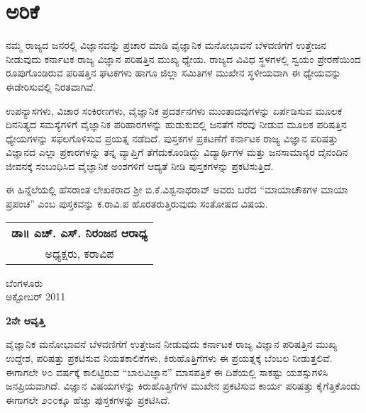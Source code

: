 \chapter*{ಅರಿಕೆ}

\phantom{a}

\vskip  -1.2cm

ನಮ್ಮ ರಾಜ್ಯದ ಜನರಲ್ಲಿ ವಿಜ್ಞಾನವನ್ನು ಪ್ರಚಾರ ಮಾಡಿ ವೈಜ್ಞಾನಿಕ ಮನೋಭಾವನೆ \linebreak ಬೆಳವಣಿಗೆಗೆ ಉತ್ತೇಜನ ನೀಡುವುದು ಕರ್ನಾಟಕ ರಾಜ್ಯ ವಿಜ್ಞಾನ ಪರಿಷತ್ತಿನ ಮುಖ್ಯ ಧ್ಯೇಯ. ರಾಜ್ಯದ ವಿವಿಧ ಸ್ಥಳಗಳಲ್ಲಿ ಸ್ವಯಂ ಪ್ರೇರಣೆಯಿಂದ ರೂಪುಗೊಂಡಿರುವ ಪರಿಷತ್ತಿನ ಘಟಕ\-ಗಳು ಹಾಗೂ ಜಿಲ್ಲಾ ಸಮಿತಿಗಳ ಮುಖೇನ ಸ್ಥಳೀಯವಾಗಿ ಈ ಧ್ಯೇಯವನ್ನು ಈಡೇರಿಸುವಲ್ಲಿ ನಿರತವಾಗಿವೆ.

ಉಪನ್ಯಾಸಗಳು, ವಿಚಾರ ಸಂಕಿರಣಗಳು, ವೈಜ್ಞಾನಿಕ ಪ್ರದರ್ಶನಗಳು ಮುಂತಾದವು\-ಗಳನ್ನು ಏರ್ಪಡಿಸುವ ಮೂಲಕ ದಿನನಿತ್ಯದ ಸಮಸ್ಯೆಗಳಿಗೆ ವೈಜ್ಞಾನಿಕ ಪರಿಹಾರಗಳನ್ನು ಹುಡುಕು\-ವಲ್ಲಿ ಜನತೆಗೆ ನೆರವು ನೀಡುವ ಮೂಲಕ ಪರಿಷತ್ತಿನ  ಧ್ಯೇಯಗಳನ್ನು ಸಫಲಗೊಳಿಸುವ ಪ್ರಯತ್ನ ನಡೆದಿದೆ. ಪುಸ್ತಕಗಳ ಪ್ರಕಟಣೆಗೆ ಕರ್ನಾಟಕ ರಾಜ್ಯ ವಿಜ್ಞಾನ ಪರಿಷತ್ತು ವಿಜ್ಞಾನದ ಎಲ್ಲಾ ಪ್ರಕಾರ\-ಗಳನ್ನು ತನ್ನ ವ್ಯಾಪ್ತಿಗೆ ತೆಗೆದುಕೊಂಡಿದ್ದು ವಿದ್ಯಾರ್ಥಿಗಳ ಮತ್ತು ಜನ\-ಸಾಮಾನ್ಯರ ದೈನಂದಿನ ಜೀವನಕ್ಕೆ ಸಂಬಂಧಿಸಿದ ವೈಜ್ಞಾನಿಕ ಅಂಶಗಳಿಗೆ ಆದ್ಯತೆ ನೀಡಿ ಪುಸ್ತಕಗಳನ್ನು \linebreak ಪ್ರಕಟಿಸುತ್ತಿದೆ.

ಈ ಹಿನ್ನೆಲೆಯಲ್ಲಿ ಹೆಸರಾಂತ ಲೇಖಕರಾದ ಶ್ರೀ ಬಿ.ಕೆ.ವಿಶ್ವನಾಥರಾವ್​ ಅವರು ಬರೆದ “ಮಾಯಾಚೌಕಗಳ ಮಾಯಾ ಪ್ರಪಂಚ” ಎಂಬ ಪುಸ್ತಕವನ್ನು ಕ.ರಾವಿ.ಪ ಹೊರತರುತ್ತಿರು\break ವುದು ಸಂತೋಷದ ವಿಷಯ.

\medskip
\medskip

\begin{flushright}
\begin{tabular}{c}
{\bf ಡಾ॥ ಎಚ್. ಎಸ್. ನಿರಂಜನ ಆರಾಧ್ಯ} \\
ಅಧ್ಯಕ್ಷರು, ಕರಾವಿಪ
\end{tabular}
\end{flushright}

\noindent
ಬೆಂಗಳೂರು\\
ಅಕ್ಟೋಬರ್ {\rm  2011}\relax
\vfill
\eject

\begin{center}
{\bf 2ನೇ ಆವೃತ್ತಿ}
\end{center}

\noindent ವೈಜ್ಞಾನಿಕ ಮನೋಭಾವನೆ ಬೆಳವಣಿಗೆಗೆ ಉತ್ತೇಜನ ನೀಡುವುದು ಕರ್ನಾಟಕ ರಾಜ್ಯ ವಿಜ್ಞಾನ ಪರಿಷತ್ತಿನ ಮುಖ್ಯ ಉದ್ದೇಶ, ಪರಿಷತ್ತು ಪ್ರಕಟಿಸುವ ನಿಯತಕಾಲಿಕೆಗಳು, ಕಿರುಹೊತ್ತಿಗೆಗಳು ಈ ಪ್ರಯತ್ನಕ್ಕೆ ಬೆಂಬಲ ನೀಡುತ್ತಲಿವೆ. ಈಗಾಗಲೇ ೪೦ ವರ್ಷಕ್ಕೆ ಕಾಲಿಟ್ಟಿರುವ “ಬಾಲವಿಜ್ಞಾನ” ಮಾಸಪತ್ರಿಕೆ ಈ ದಿಶೆಯಲ್ಲಿ ಸಾಕಷ್ಟು ಯಶಸ್ಸುಗಳಿಸಿ ಜನಪ್ರಿಯವಾಗಿದೆ. ವಿಜ್ಞಾನ ವಿಷಯ\-ಗಳನ್ನು ಕಿರುಹೊತ್ತಿಗೆಗಳ ಮುಖೇನ ಪ್ರಕಟಿಸುವ ಕಾರ್ಯ ಪರಿಷತ್ತು ಕೈಗೆತ್ತಿಕೊಂಡು ಈಗಾಗಲೇ ೨೦೦ಕ್ಕೂ ಹೆಚ್ಚು ಪುಸ್ತಕಗಳನ್ನು  ಪ್ರಕಟಿಸಿದೆ. 

